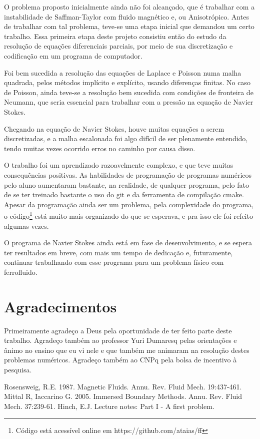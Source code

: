 \documentclass[journal]{IEEEtran}
\begin{document}
O problema proposto inicialmente ainda não foi alcançado, que é trabalhar com a instabilidade de Saffman-Taylor com fluido magnético e, ou Anisotrópico. Antes de trabalhar com tal problema, teve-se uma etapa inicial que demandou um certo trabalho. Essa primeira etapa deste projeto consistiu então do estudo da resolução de equações diferenciais parciais, por meio de sua discretização e codificação em um programa de computador.

Foi bem sucedida a resolução das equações de Laplace e Poisson numa malha quadrada, pelos métodos implícito e explícito, usando diferenças finitas. No caso de Poisson, ainda teve-se a resolução bem sucedida com condições de fronteira de Neumann, que seria essencial para trabalhar com a pressão na equação de Navier Stokes.

Chegando na equação de Navier Stokes, houve muitas equações a serem discretizadas, e a malha escalonada foi algo difícil de ser plenamente entendido, tendo muitas vezes ocorrido erros no caminho por causa disso.

O trabalho foi um aprendizado razoavelmente complexo, e que teve muitas consequências positivas. As habilidades de programação de programas numéricos pelo aluno aumentaram bastante, na realidade, de qualquer programa, pelo fato de se ter treinado bastante o uso do git e da ferramenta de compilação cmake. Apesar da programação ainda ser um problema, pela complexidade do programa, o código\footnote{Código está acessível online em https://github.com/ataias/ff} está muito mais organizado do que se esperava, e pra isso ele foi refeito algumas vezes.

O programa de Navier Stokes ainda está em fase de desenvolvimento, e se espera ter resultados em breve, com mais um tempo de dedicação e, futuramente, continuar trabalhando com esse programa para um problema físico com ferrofluido.

\section*{Agradecimentos}

Primeiramente agradeço a Deus pela oportunidade de ter feito parte deste trabalho. Agradeço também ao professor Yuri Dumaresq pelas orientações e ânimo no ensino que eu vi nele e que também me animaram na resolução destes problemas numéricos. Agradeço também ao CNPq pela bolsa de incentivo à pesquisa.

\begin{thebibliography}{4}
 Rosensweig, R.E. 1987. Magnetic Fluids. Annu. Rev. Fluid Mech. 19:437-461.
 Mittal R, Iaccarino G. 2005. Immersed Boundary Methods. Annu. Rev. Fluid Mech. 37:239-61.
 Hinch, E.J. Lecture notes: Part I - A first problem. 
\end{thebibliography}
\end{document}
